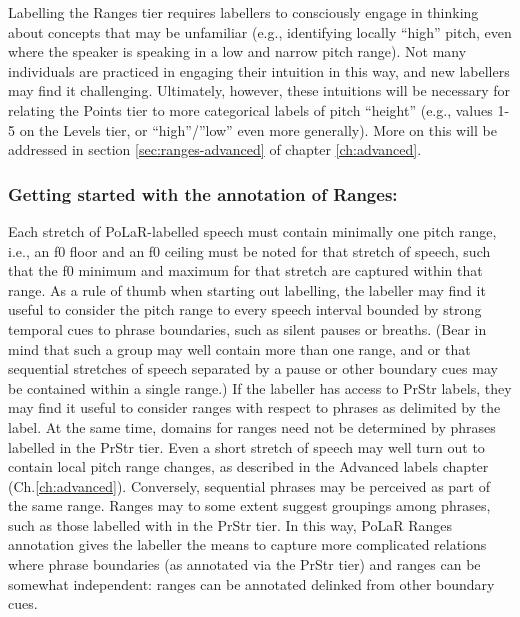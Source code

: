 \documentclass[11pt, twoside]{memoir}
\def\textlabel#1{{\relsize{-.5}\fontspec[Mapping=tex-text]{Roboto Mono}{#1}}}
\begin{document}
Labelling the Ranges tier requires labellers to consciously engage in thinking about concepts that may be unfamiliar (e.g., identifying locally “high” pitch, even where the speaker is speaking in a low and narrow pitch range). Not many individuals are practiced in engaging their intuition in this way, and new labellers may find it challenging. Ultimately, however, these intuitions will be necessary for relating the Points tier to more categorical labels of pitch “height” (e.g., values 1-5 on the Levels tier, or “high”\slash ”low” even more generally). More on this will be addressed in section \ref{sec:ranges-advanced} of chapter \ref{ch:advanced}.
\subsubsection{Getting started with the annotation of Ranges:}\label{sec:getting-started-with-the-annotation-of-ranges}
Each stretch of PoLaR-labelled speech must contain minimally one pitch range, i.e., an f0 floor and an f0 ceiling must be noted for that stretch of speech, such that the f0 minimum and maximum for that stretch are captured within that range. As a rule of thumb when starting out labelling, the labeller may find it useful to consider the pitch range to every speech interval bounded by strong temporal cues to phrase boundaries, such as silent pauses or breaths. (Bear in mind that such a group may well contain more than one range, and or that sequential stretches of speech separated by a pause or other boundary cues may be contained within a single range.)
If the labeller has access to PrStr labels, they may find it useful to consider ranges with respect to phrases as delimited by the \textlabel{]} label. At the same time, domains for ranges need not be determined by phrases labelled in the PrStr tier. Even a short stretch of speech may well turn out to contain local pitch range changes, as described in the Advanced labels chapter (Ch.\ref{ch:advanced}). Conversely, sequential phrases may be perceived as part of the same range. Ranges may to some extent suggest groupings among phrases, such as those labelled with \textlabel{]} in the PrStr tier. In this way, PoLaR Ranges annotation gives the labeller the means to capture more complicated relations where phrase boundaries (as annotated via the PrStr tier) and ranges can be somewhat independent: ranges can be annotated delinked from other boundary cues.
\end{document}
